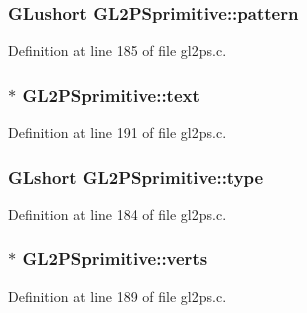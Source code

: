 \subsubsection[{pattern}]{\setlength{\rightskip}{0pt plus 5cm}G\+Lushort G\+L2\+P\+Sprimitive\+::pattern}\label{struct_g_l2_p_sprimitive_a60f7dcbf793edb8c10f617e77a817c33}


Definition at line 185 of file gl2ps.\+c.

\hypertarget{struct_g_l2_p_sprimitive_af54b8ee11bcb5cc40daed4f311597053}{}
\subsubsection[{text}]{$\ast$ G\+L2\+P\+Sprimitive\+::text}\label{struct_g_l2_p_sprimitive_af54b8ee11bcb5cc40daed4f311597053}


Definition at line 191 of file gl2ps.\+c.

\hypertarget{struct_g_l2_p_sprimitive_a760f35c02d70a961d9a1e2c39f083136}{}
\subsubsection[{type}]{\setlength{\rightskip}{0pt plus 5cm}G\+Lshort G\+L2\+P\+Sprimitive\+::type}\label{struct_g_l2_p_sprimitive_a760f35c02d70a961d9a1e2c39f083136}


Definition at line 184 of file gl2ps.\+c.

\hypertarget{struct_g_l2_p_sprimitive_a8e2aec50f1c86078f89a930588f30f0c}{}
\subsubsection[{verts}]{$\ast$ G\+L2\+P\+Sprimitive\+::verts}\label{struct_g_l2_p_sprimitive_a8e2aec50f1c86078f89a930588f30f0c}


Definition at line 189 of file gl2ps.\+c.

\hypertarget{struct_g_l2_p_sprimitive_aebf18baa0efe97f7e57bef844d998d76}{}
